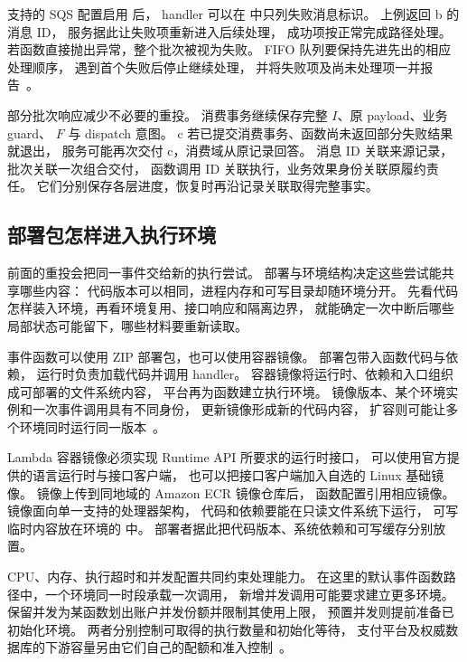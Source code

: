 支持的 SQS 配置启用  后，
handler 可以在  中只列失败消息标识。
上例返回 b 的消息 ID，
服务据此让失败项重新进入后续处理，
成功项按正常完成路径处理。
若函数直接抛出异常，整个批次被视为失败。
FIFO 队列要保持先进先出的相应处理顺序，
遇到首个失败后停止继续处理，
并将失败项及尚未处理项一并报告~\cite{lambda-sqs-partial}。

部分批次响应减少不必要的重投。
消费事务继续保存完整 $I$、原 payload、业务 guard、
$F$ 与 dispatch 意图。
c 若已提交消费事务、函数尚未返回部分失败结果就退出，
服务可能再次交付 c，消费域从原记录回答。
消息 ID 关联来源记录，批次关联一次组合交付，
函数调用 ID 关联执行，业务效果身份关联原履约责任。
它们分别保存各层进度，恢复时再沿记录关联取得完整事实。

\subsection{部署包怎样进入执行环境}

前面的重投会把同一事件交给新的执行尝试。
部署与环境结构决定这些尝试能共享哪些内容：
代码版本可以相同，进程内存和可写目录却随环境分开。
先看代码怎样装入环境，再看环境复用、接口响应和隔离边界，
就能确定一次中断后哪些局部状态可能留下，哪些材料要重新读取。

事件函数可以使用 ZIP 部署包，也可以使用容器镜像。
部署包带入函数代码与依赖，
运行时负责加载代码并调用 handler。
容器镜像将运行时、依赖和入口组织成可部署的文件系统内容，
平台再为函数建立执行环境。
镜像版本、某个环境实例和一次事件调用具有不同身份，
更新镜像形成新的代码内容，
扩容则可能让多个环境同时运行同一版本~\cite{lambda-container-images}。

Lambda 容器镜像必须实现 Runtime API 所要求的运行时接口，
可以使用官方提供的语言运行时与接口客户端，
也可以把接口客户端加入自选的 Linux 基础镜像。
镜像上传到同地域的 Amazon ECR 镜像仓库后，
函数配置引用相应镜像。
镜像面向单一支持的处理器架构，
代码和依赖要能在只读文件系统下运行，
可写临时内容放在环境的  中。
部署者据此把代码版本、系统依赖和可写缓存分别放置。


CPU、内存、执行超时和并发配置共同约束处理能力。
在这里的默认事件函数路径中，一个环境同一时段承载一次调用，
新增并发调用可能要求建立更多环境。
保留并发为某函数划出账户并发份额并限制其使用上限，
预置并发则提前准备已初始化环境。
两者分别控制可取得的执行数量和初始化等待，
支付平台及权威数据库的下游容量另由它们自己的配额和准入控制~\cite{lambda-concurrency}。

